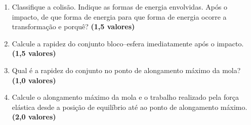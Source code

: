 \documentclass[12pt]{article}
\newcommand{\pontos}[1]{\hfill\textbf{(#1 valores)}}
\begin{document}
\begin{enumerate}[label=\textbf{\alph*)}]
	\item Classifique a colisão. Indique as formas de energia envolvidas. Após o impacto,
	de que forma de energia para que forma de energia ocorre a transformação e porquê? \pontos{1,5}
	\item Calcule a rapidez do conjunto bloco--esfera imediatamente após o impacto. \pontos{1,5}
	\item Qual é a rapidez do conjunto no ponto de alongamento máximo da mola? \pontos{1,0}
	\item Calcule o alongamento máximo da mola e o trabalho realizado pela força elástica
	desde a posição de equilíbrio até ao ponto de alongamento máximo. \pontos{2,0}
\end{enumerate}
\end{document}
